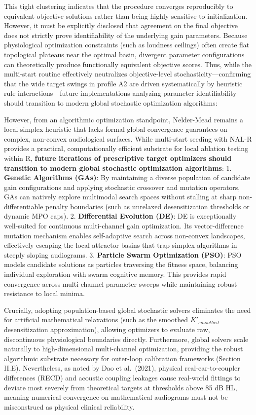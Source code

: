 \documentclass[
  12pt,
]{article}
\begin{document}
This tight clustering indicates that the procedure converges
reproducibly to equivalent objective solutions rather than being highly
sensitive to initialization. However, it must be explicitly disclosed
that agreement on the final objective does not strictly prove
identifiability of the underlying gain parameters. Because physiological
optimization constraints (such as loudness ceilings) often create flat
topological plateaus near the optimal basin, divergent parameter
configurations can theoretically produce functionally equivalent
objective scores. Thus, while the multi-start routine effectively
neutralizes objective-level stochasticity---confirming that the wide
target swings in profile A2 are driven systematically by heuristic rule
interactions---future implementations analyzing parameter
identifiability should transition to modern global stochastic
optimization algorithms:

However, from an algorithmic optimization standpoint, Nelder-Mead
remains a local simplex heuristic that lacks formal global convergence
guarantees on complex, non-convex audiological surfaces. While
multi-start seeding with NAL-R provides a practical, computationally
efficient substrate for local ablation testing within R, \textbf{future
iterations of prescriptive target optimizers should transition to modern
global stochastic optimization algorithms}: 1. \textbf{Genetic
Algorithms (GAs)}: By maintaining a diverse population of candidate gain
configurations and applying stochastic crossover and mutation operators,
GAs can natively explore multimodal search spaces without stalling at
sharp non-differentiable penalty boundaries (such as unrelaxed
desensitization thresholds or dynamic MPO caps). 2. \textbf{Differential
Evolution (DE)}: DE is exceptionally well-suited for continuous
multi-channel gain optimization. Its vector-difference mutation
mechanism enables self-adaptive search across non-convex landscapes,
effectively escaping the local attractor basins that trap simplex
algorithms in steeply sloping audiograms. 3. \textbf{Particle Swarm
Optimization (PSO)}: PSO models candidate solutions as particles
traversing the fitness space, balancing individual exploration with
swarm cognitive memory. This provides rapid convergence across
multi-channel parameter sweeps while maintaining robust resistance to
local minima.

Crucially, adopting population-based global stochastic solvers
eliminates the need for artificial mathematical relaxations (such as the
smoothed \(K'_{smoothed}\) desensitization approximation), allowing
optimizers to evaluate raw, discontinuous physiological boundaries
directly. Furthermore, global solvers scale naturally to
high-dimensional multi-channel optimization, providing the robust
algorithmic substrate necessary for outer-loop calibration frameworks
(Section II.E). Nevertheless, as noted by Dao et al.~(2021), physical
real-ear-to-coupler differences (RECD) and acoustic coupling leakages
cause real-world fittings to deviate most severely from theoretical
targets at thresholds above 85 dB HL, meaning numerical convergence on
mathematical audiograms must not be misconstrued as physical clinical
reliability.
\end{document}
